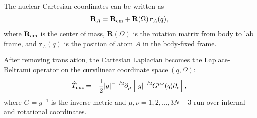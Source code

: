 \documentclass[11pt]{revtex4-2}
\begin{document}
The nuclear Cartesian coordinates can be written as
\begin{equation}
  \mathbf{R}_A
  =
  \mathbf{R}_{\rm cm}
  +
  \mathbf{R}(\Omega)\,
  \mathbf{r}_A(q),
  \label{eq:coordinate-map}
\end{equation}
where $\mathbf{R}_{\rm cm}$ is the center of mass, $\mathbf{R}(\Omega)$ is
the rotation matrix from body to lab frame, and $\mathbf{r}_A(q)$ is the
position of atom $A$ in the body-fixed frame.

After removing translation, the Cartesian Laplacian becomes the
Laplace-Beltrami operator on the curvilinear coordinate space $(q,\Omega)$:
\begin{equation}
  \hat{T}_{\rm nuc}
  =
  -\frac{1}{2}
  |g|^{-1/2}
  \partial_\mu
  \left[
    |g|^{1/2}
    G^{\mu\nu}(q)
    \partial_\nu
  \right],
  \label{eq:laplace-beltrami}
\end{equation}
where $G=g^{-1}$ is the inverse metric and $\mu,\nu = 1, 2, \ldots, 3N-3$ run over internal and
rotational coordinates.
\end{document}
